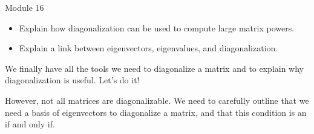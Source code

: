 \documentclass{workbook}
\begin{document}
\begin{lesson}

	Module 16

	\begin{itemize}
		\item Explain how diagonalization can be used to compute large matrix powers.
		\item Explain a link between eigenvectors, eigenvalues, and diagonalization.

	\end{itemize}

	We finally have all the tools we need to diagonalize a matrix and to explain why diagonalization is useful.
	Let's do it!

	However, not all matrices are diagonalizable. We need to carefully outline that we need a
	basis of eigenvectors to diagonalize a matrix, and that this condition is an if and only if.

\end{lesson}
\end{document}
